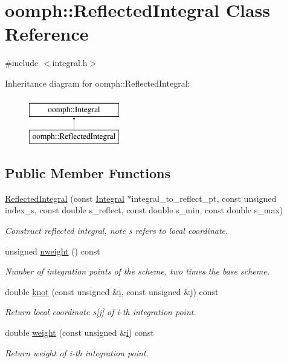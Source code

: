 \hypertarget{classoomph_1_1ReflectedIntegral}{}\section{oomph\+:\+:Reflected\+Integral Class Reference}
\label{classoomph_1_1ReflectedIntegral}


{\ttfamily \#include $<$integral.\+h$>$}

Inheritance diagram for oomph\+:\+:Reflected\+Integral\+:\begin{figure}[H]
\begin{center}
\leavevmode
\includegraphics[height=2.000000cm]{classoomph_1_1ReflectedIntegral}
\end{center}
\end{figure}
\subsection*{Public Member Functions}
\begin{DoxyCompactItemize}
\item 
\hyperlink{classoomph_1_1ReflectedIntegral_af915034fdc52963d3f177be829e6ef1a}{Reflected\+Integral} (const \hyperlink{classoomph_1_1Integral}{Integral} $\ast$integral\+\_\+to\+\_\+reflect\+\_\+pt, const unsigned index\+\_\+s, const double s\+\_\+reflect, const double s\+\_\+min, const double s\+\_\+max)
\begin{DoxyCompactList}\small\item\em Construct reflected integral, note s refers to local coordinate. \end{DoxyCompactList}\item 
unsigned \hyperlink{classoomph_1_1ReflectedIntegral_ad448bbdee22baa638f492ef42327f0d3}{nweight} () const
\begin{DoxyCompactList}\small\item\em Number of integration points of the scheme, two times the base scheme. \end{DoxyCompactList}\item 
double \hyperlink{classoomph_1_1ReflectedIntegral_af315971c60753e39fca60c108da3e5c0}{knot} (const unsigned \&\hyperlink{cfortran_8h_adb50e893b86b3e55e751a42eab3cba82}{i}, const unsigned \&j) const
\begin{DoxyCompactList}\small\item\em Return local coordinate s\mbox{[}j\mbox{]} of i-\/th integration point. \end{DoxyCompactList}\item 
double \hyperlink{classoomph_1_1ReflectedIntegral_afe7ded626ef075a55f6e99abf258e362}{weight} (const unsigned \&\hyperlink{cfortran_8h_adb50e893b86b3e55e751a42eab3cba82}{i}) const
\begin{DoxyCompactList}\small\item\em Return weight of i-\/th integration point. \end{DoxyCompactList}\end{DoxyCompactItemize}

